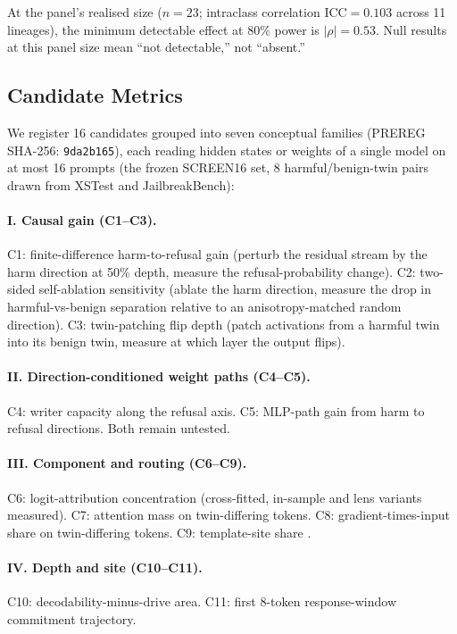 \documentclass[11pt,letterpaper]{article}
\begin{document}
At the panel's realised size ($n = 23$; intraclass correlation
$\text{ICC} = 0.103$ across 11 lineages), the minimum detectable effect
at 80\% power is $|\rho| = 0.53$. Null results at this panel size mean
``not detectable,'' not ``absent.''

\subsection{Candidate Metrics}
\label{sec:candidates}

We register 16 candidates grouped into seven conceptual families
(PREREG SHA-256: \texttt{9da2b165}), each reading hidden states or
weights of a single model on at most 16 prompts (the frozen SCREEN16 set,
8 harmful/benign-twin pairs drawn from XSTest and JailbreakBench):

\paragraph{I. Causal gain (C1--C3).}
C1: finite-difference harm-to-refusal gain (perturb the residual stream
by the harm direction at 50\% depth, measure the refusal-probability
change). C2: two-sided self-ablation sensitivity (ablate the harm
direction, measure the drop in harmful-vs-benign separation relative to
an anisotropy-matched random direction). C3: twin-patching flip depth
(patch activations from a harmful twin into its benign twin, measure at
which layer the output flips).

\paragraph{II. Direction-conditioned weight paths (C4--C5).}
C4: writer capacity along the refusal axis. C5: MLP-path gain from harm
to refusal directions. Both remain untested.

\paragraph{III. Component and routing (C6--C9).}
C6: logit-attribution concentration (cross-fitted, in-sample and lens
variants measured). C7: attention mass on twin-differing tokens. C8:
gradient-times-input share on twin-differing tokens. C9: template-site
share \citep{Leong2025}.

\paragraph{IV. Depth and site (C10--C11).}
C10: decodability-minus-drive area. C11: first 8-token response-window
commitment trajectory.
\end{document}

